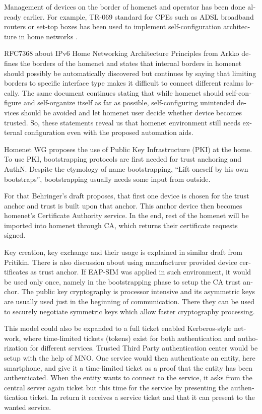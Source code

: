 \documentclass[12pt,a4paper,english]{tutthesis}
\begin{document}
\begin{otherlanguage}{english}
Management of devices on the border of homenet and operator has 
been done already earlier. For example, TR-069 standard
\cite{iptvtr069} for CPEs such as ADSL broadband routers or
set-top boxes has been used to implement self-configuration
archi\-tecture in
home networks \cite{tr069rachidi2011}.


RFC7368 about IPv6 Home Networking Architecture Principles from
Arkko \cite{rfc7368} defines the borders of the homenet and states that
internal borders in homenet should possibly be automatically
discovered but continues by saying that limiting borders to specific
interface type makes it difficult to connect different realms locally.
The same document continues stating
that while homenet should self-configure and self-organize itself as
far as possible, self-configuring unintended devices should be
avoided and let homenet user decide whether device becomes trusted.
So, these statements reveal us that homenet environment still needs
external configuration even with the proposed automation aids.






Homenet WG proposes the use of Public Key Infrastructure (PKI) at the home. To use PKI, bootstrapping
protocols are first needed for trust anchoring and AuthN.  
Despite the etymology  of name bootstrapping, ``Lift oneself by his own bootstraps'', 
bootstrapping usually needs some input from outside. 

For that Behringer's draft \cite{draft-behringer-bootstrap} proposes,
that first one device is chosen for the trust anchor and trust is
built upon that anchor. This anchor device then becomes homenet's
Certificate Authority service. In the end, rest of the homenet will be
imported into homenet through CA, which returns their certificate
requests signed.


Key creation, key exchange and their usage is explained in similar
draft from Pritikin\cite{draft-pritikin-bootstrap}. There is also discussion about using
manufacturer provided device certificates as trust anchor.  If EAP-SIM
was applied in such environment, it would be used only once, namely in
the bootstrapping phase to setup the CA trust anchor.  The public key
cryptography is processor intensive and its asymmetric keys are
usually used just in the beginning of communication. There they can be
used to securely negotiate symmetric keys which allow faster
cryptography processing. 


This model could also be expanded to a full ticket enabled
Kerberos-style network, where time-limited tickets (tokens) exist for
both authentication and authorization for different services. Trusted
Third Party authentication center would be setup with the help of MNO.
One service would then authenticate an entity, here smartphone, and
give it a time-limited ticket as a proof that the entity has been authenticated.
When the entity wants to connect to the service, it asks from the central 
server again ticket but this time for the service by presenting
the authentication ticket. In return it receives a service ticket and that
it can present to the wanted service.







\end{otherlanguage}
\end{document}
